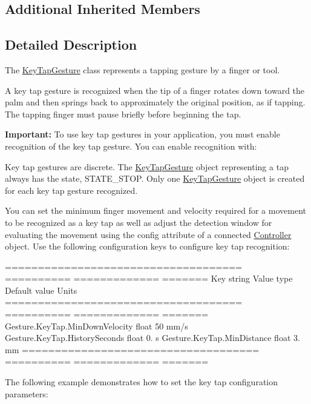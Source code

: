 \subsection*{Additional Inherited Members}


\subsection{Detailed Description}
The \hyperlink{class_leap_1_1_key_tap_gesture}{Key\+Tap\+Gesture} class represents a tapping gesture by a finger or tool.

A key tap gesture is recognized when the tip of a finger rotates down toward the palm and then springs back to approximately the original position, as if tapping. The tapping finger must pause briefly before beginning the tap.



{\bfseries Important\+:} To use key tap gestures in your application, you must enable recognition of the key tap gesture. You can enable recognition with\+:


\begin{DoxyCodeInclude}
\end{DoxyCodeInclude}


Key tap gestures are discrete. The \hyperlink{class_leap_1_1_key_tap_gesture}{Key\+Tap\+Gesture} object representing a tap always has the state, S\+T\+A\+T\+E\+\_\+\+S\+T\+OP. Only one \hyperlink{class_leap_1_1_key_tap_gesture}{Key\+Tap\+Gesture} object is created for each key tap gesture recognized.

You can set the minimum finger movement and velocity required for a movement to be recognized as a key tap as well as adjust the detection window for evaluating the movement using the config attribute of a connected \hyperlink{class_leap_1_1_controller}{Controller} object. Use the following configuration keys to configure key tap recognition\+:

==================================== ========== ============= ======= Key string Value type Default value Units ==================================== ========== ============= ======= Gesture.\+Key\+Tap.\+Min\+Down\+Velocity float 50 mm/s Gesture.\+Key\+Tap.\+History\+Seconds float 0. s Gesture.\+Key\+Tap.\+Min\+Distance float 3. mm ==================================== ========== ============= ======= 

The following example demonstrates how to set the key tap configuration parameters\+:


\begin{DoxyCodeInclude}
\end{DoxyCodeInclude}


